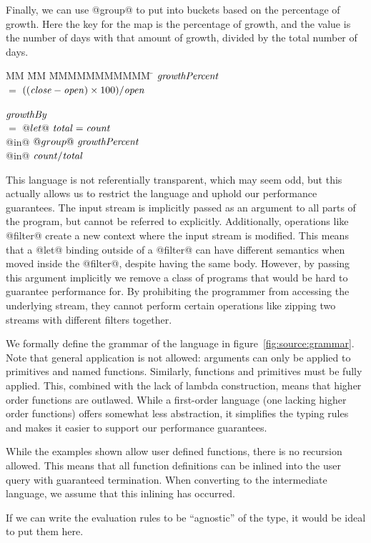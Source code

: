Finally, we can use @group@ to put into buckets based on the percentage of growth.
Here the key for the map is the percentage of growth, and the value is the number of days with that amount of growth, divided by the total number of days.
\begin{tabbing}
MM \= MM \= MMMMMMMMMMM \= \kill
$\mathit{growthPercent}$                                        \\
 \> $=$  \> $((\mathit{close}-\mathit{open}) \times 100 ) / \mathit{open}$  \\
                                                            \\
$\mathit{growthBy}$                                             \\
 \> $=$  \> $@let@~\mathit{total} = \mathit{count}$                 \\
 \> @in@ \> $@group@~\mathit{growthPercent}$                    \\
 \> @in@ \> $\mathit{count} / \mathit{total}$                    \\
\end{tabbing}



This language is not referentially transparent, which may seem odd, but this actually allows us to restrict the language and uphold our performance guarantees.
The input stream is implicitly passed as an argument to all parts of the program, but cannot be referred to explicitly.
Additionally, operations like @filter@ create a new context where the input stream is modified.
This means that a @let@ binding outside of a @filter@ can have different semantics when moved inside the @filter@, despite having the same body.
However, by passing this argument implicitly we remove a class of programs that would be hard to guarantee performance for.
By prohibiting the programmer from accessing the underlying stream, they cannot perform certain operations like zipping two streams with different filters together.

We formally define the grammar of the language in figure~\ref{fig:source:grammar}.
Note that general application is not allowed: arguments can only be applied to primitives and named functions.
Similarly, functions and primitives must be fully applied.
This, combined with the lack of lambda construction, means that higher order functions are outlawed.
While a first-order language (one lacking higher order functions) offers somewhat less abstraction, it simplifies the typing rules and makes it easier to support our performance guarantees.

While the examples shown allow user defined functions, there is no recursion allowed.
This means that all function definitions can be inlined into the user query with guaranteed termination.
When converting to the intermediate language, we assume that this inlining has occurred.

If we can write the evaluation rules to be ``agnostic'' of the type, it would be ideal to put them here.




